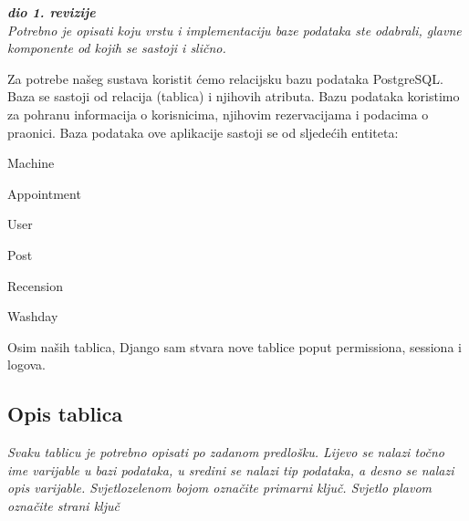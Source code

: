 			\textbf{\textit{dio 1. revizije}}\\
			
		\textit{Potrebno je opisati koju vrstu i implementaciju baze podataka ste odabrali, glavne komponente od kojih se sastoji i slično.}
				
		\noindent Za potrebe našeg sustava koristit ćemo relacijsku bazu podataka PostgreSQL.
		Baza se sastoji od relacija (tablica) i njihovih atributa. Bazu podataka koristimo za pohranu informacija o korisnicima, njihovim rezervacijama i podacima o praonici.
		Baza podataka ove aplikacije sastoji se od sljedećih entiteta:
		\begin{packed_item}
			\item 	Machine
			\item 	Appointment
			\item 	User
			\item 	Post
			\item 	Recension
			\item 	Washday
		\end{packed_item}	
	
		\noindent Osim naših tablica, Django sam stvara nove tablice poput permissiona, sessiona i logova.
		
			\subsection{Opis tablica}
			
				
				\textit{Svaku tablicu je potrebno opisati po zadanom predlošku. Lijevo se nalazi točno ime varijable u bazi podataka, u sredini se nalazi tip podataka, a desno se nalazi opis varijable. Svjetlozelenom bojom označite primarni ključ. Svjetlo plavom označite strani ključ}

			
